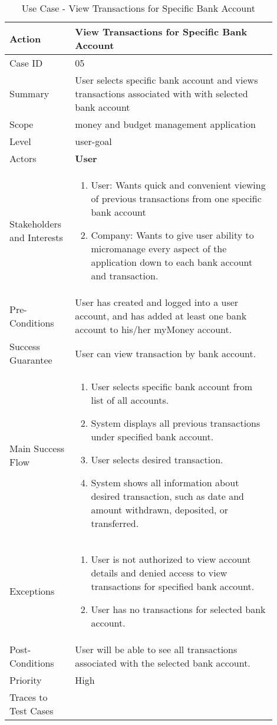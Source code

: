 \documentclass[11pt]{article}
\newcounter{use case ID}
\newcommand\tabularhead[1]{
    \begin{table}[ht]
        \addtocounter{use case ID}{1}
        \caption{Use Case \arabic{use case ID} - #1}
        \vspace{0.2cm}
        \begin{tabular}{|p{0.2\linewidth}|p{0.70\linewidth}|}
            \hline
            \textbf{Action} & \textbf{#1} \\
            \hline}
\newcommand\addrow[2]{#1 & #2\\ \hline}
\newcommand\addmulrow[2]{ \begin{minipage}[t][][t]{2.5cm}#1\end{minipage}
                &\begin{minipage}[t][][t]{11cm}
                    \begin{enumerate}[itemsep=-1ex] #2   \end{enumerate}
                \end{minipage}\vfill\\ \hline}
\newenvironment{usecase}{\tabularhead}
        {\hline\end{tabular}\end{table}}
\begin{document}
\begin{usecase}{View Transactions for Specific Bank Account}
    \addrow{Case ID}{05}
    \addrow{Summary}{User selects specific bank account and views transactions associated with with selected bank account}
    \addrow{Scope}{money and budget management application}
    \addrow{Level}{user-goal}
    \addrow{Actors}{\textbf{User}}
    \addmulrow{Stakeholders and Interests}{
    \item User: Wants quick and convenient viewing of previous transactions from one specific bank account
    \item Company: Wants to give user ability to micromanage every aspect of the application down to each bank account and transaction.}
    \addrow{Pre-Conditions}{User has created and logged into a user account, and has added at least one bank account to his/her myMoney account. }
    \addrow{Success Guarantee}{User can view transaction by bank account.}
    \addmulrow{Main Success Flow}{
    \item User selects specific bank account from list of all accounts.
    \item System displays all previous transactions under specified bank account.
    \item User selects desired transaction.
    \item System shows all information about desired transaction, such as date and amount withdrawn, deposited, or transferred.}
    \addmulrow{Exceptions}{
    \item User is not authorized to view account details and denied access to view transactions for specified bank account.
    \item User has no transactions for selected bank account.
    }
    \addrow{Post-Conditions}{
    User will be able to see all transactions associated with the selected bank account.
    }
    \addrow{Priority}{High}
    \addrow{Traces to Test Cases}{}
\end{usecase}
\end{document}
